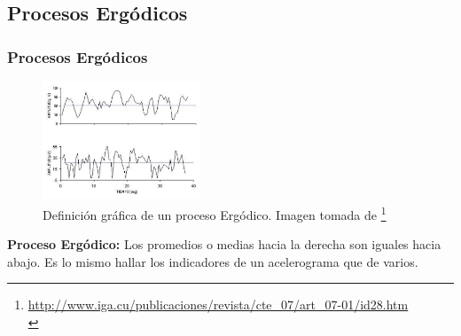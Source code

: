 \documentclass{beamer}
\begin{document}
\subsection{Procesos Ergódicos}
\begin{frame}%
\frametitle{Procesos Ergódicos}
%
\justifying
%
\begin{figure}[h]
	\centering
	\includegraphics[height=3.5cm]{img/Ergodico.pdf}
	\caption{Definición gráfica de un proceso Ergódico. Imagen tomada de \footnote{\tiny \url{http://www.iga.cu/publicaciones/revista/cte_07/art_07-01/id28.htm}\\}}
\end{figure}
%
\textbf{Proceso Ergódico:} Los promedios o medias hacia la derecha son iguales hacia abajo. Es lo mismo hallar los indicadores de un acelerograma que de varios.\\
%
\end{frame}
%
%
\end{document}
